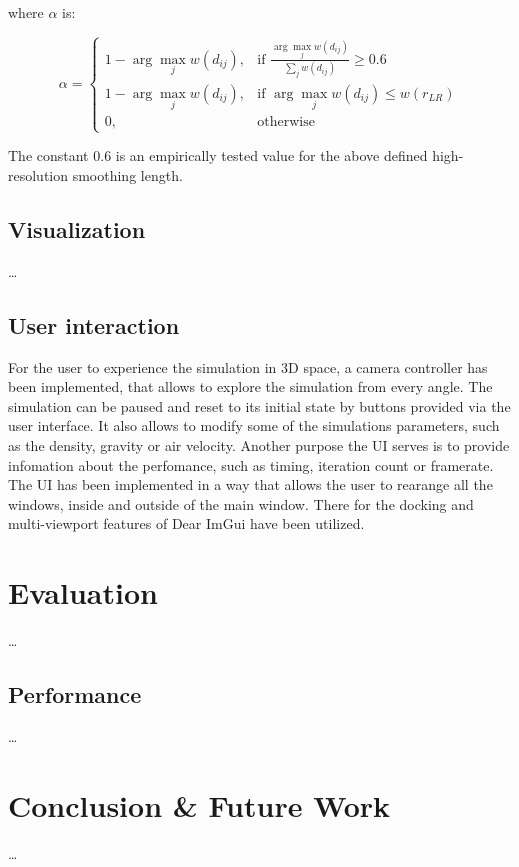 \documentclass[intern]{cgMA}
\begin{document}
    where $\alpha$ is:

    \begin{equation}
        \alpha = 
        \begin{cases}
            1 - \arg \max_j w(d_{ij}),& \text{if } \frac{\arg \max_j w(d_{ij})}{\sum_j w(d_{ij})} \geq 0.6 \\
            1 - \arg \max_j w(d_{ij}),& \text{if } \arg \max_j w(d_{ij}) \leq w(r_{LR}) \\
            0,              & \text{otherwise}
        \end{cases}
    \end{equation}

    The constant $0.6$ is an empirically tested value for the above defined high-resolution smoothing length. \cite{10.2312:PE:vriphys:vriphys12:053-060} 
    
    \subsection{Visualization}
    \dots

    \subsection{User interaction}
    For the user to experience the simulation in 3D space, a camera controller has been implemented, that allows to explore the simulation from every angle. The simulation can be paused and reset to its initial state by buttons provided via the user interface. It also allows to modify some of the simulations parameters, such as the density, gravity or air velocity. Another purpose the UI serves is to provide infomation about the perfomance, such as timing, iteration count or framerate. The UI has been implemented in a way that allows the user to rearange all the windows, inside and outside of the main window. There for the docking and multi-viewport features of Dear ImGui have been utilized.
    
    \pagebreak
    \section{Evaluation} \label{sec:results}
    \dots
    
    \subsection{Performance}
    \dots
    \pagebreak
    \section{Conclusion \& Future Work}  \label{sec:end}
    \dots
    \pagebreak
    \listoffigures
    \pagebreak
    \printbibliography
\end{document}
